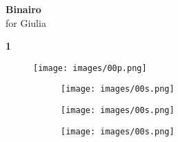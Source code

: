 \documentclass[a4paper]{article}
\begin{document}

\hspace{0pt}
\vspace{6cm}
\begin{center}
	\fontsize{80}{100}\selectfont \textbf{Binairo} \normalsize\\
	\vspace{1cm}
	\LARGE for Giulia \normalsize
\end{center}
\vfill
\hspace{0pt}


\pagebreak
\hspace{0pt}
\flushright \fontsize{50}{60}\selectfont \textbf{1} \normalsize
\vfill
\begin{figure}[h]
	\centering
	\texttt{[image: images/00p.png]}
\end{figure}
\vfill
\hspace{0pt}

\begin{figure}
	\centering
	\begin{subfigure}{0.3\textwidth}
		\texttt{[image: images/00s.png]}
	\end{subfigure}
	\hfill
	\begin{subfigure}{0.3\textwidth}
		\texttt{[image: images/00s.png]}
	\end{subfigure}
	\hfill
	\begin{subfigure}{0.3\textwidth}
		\texttt{[image: images/00s.png]}
	\end{subfigure}
\end{figure}
\end{document}
